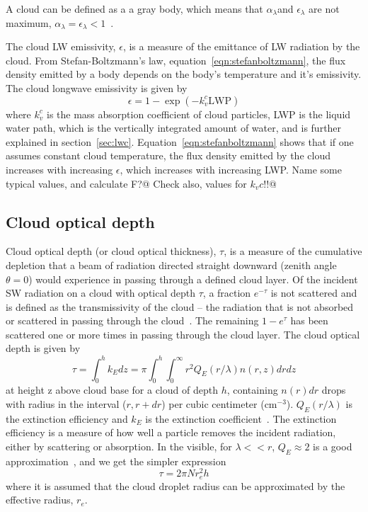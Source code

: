 A cloud can be defined as a a gray body, which means that $\alpha_{\lambda}$and $\epsilon_{\lambda}$ are not maximum, $\alpha_{\lambda}=\epsilon_{\lambda}<1$~\citep{Liou2002}.

The cloud LW emissivity, $\epsilon$, is a measure of the emittance of LW radiation by the cloud. From Stefan-Boltzmann's law, equation~\ref{eqn:stefanboltzmann}, the flux density emitted by a body depends on the body's temperature and it's emissivity. The cloud longwave emissivity is given by~\cite{Liou1992}
\begin{equation}
\epsilon = 1 - \exp(-k_v^c \text{LWP})
\label{eqn:epsilon_lw}
\end{equation}
where $k_v^c$ is the mass absorption coefficient of cloud particles, LWP is the liquid water path, which is the vertically integrated amount of water, and is further explained in section~\ref{sec:lwc}. Equation~\ref{eqn:stefanboltzmann} shows that if one assumes constant cloud temperature, the flux density emitted by the cloud increases with increasing $\epsilon$, which increases with increasing LWP. Name some typical values, and calculate F?@ Check also, values for $k_v c$!!@

\subsection{Cloud optical depth}
\label{sec:cloudoptdep}
Cloud optical depth (or cloud optical thickness), $\tau$, is a measure of the cumulative depletion that a beam of radiation directed straight downward (zenith angle $\theta = 0$) would experience in passing through a defined cloud layer. Of the incident SW radiation on a cloud with optical depth $\tau$, a fraction $e^{-\tau}$ is not scattered and is defined as the transmissivity of the cloud -- the radiation that is not absorbed or scattered in passing through the cloud~\citep{Wallace2006}. The remaining $1-e^{\tau}$ has been scattered one or more times in passing through the cloud layer. The cloud optical depth is given by~\citep{Twomey1977}
\begin{equation}
\tau = \int_0^h k_{E}dz = \pi \int_0^h \int_0^{\infty} r^2 Q_E(r/\lambda) n(r,z) dr dz
\end{equation}
at height z above cloud base for a cloud of depth $h$, containing $n(r)dr$ drops with radius in the interval ($r, r + dr$) per cubic centimeter ($\text{cm}^{-3}$). $Q_E(r/\lambda)$ is the extinction efficiency and $k_{E}$ is the extinction coefficient~\citep{Twomey1977}. The extinction efficiency is a measure of how well a particle removes the incident radiation, either by scattering or absorption. In the visible, for $\lambda<<r$, $Q_E\approx 2$ is a good approximation~\citep{Hobbs1993}, and we get the simpler expression
\begin{equation}
\tau = 2\pi N r_e^2 h
\label{eqn:cloudtau1}
\end{equation}
where it is assumed that the cloud droplet radius can be approximated by the effective radius, $r_e$.

